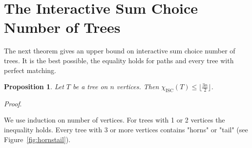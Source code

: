 \documentclass[11pt,a4paper]{article}
\theoremstyle{plain}
\newtheorem{prop}[thm]{Proposition}
\newenvironment{pf}{
  \par\medskip\noindent
  \textit{Proof}.
}{
\newline
\rightline{$\square$}  %
}
\theoremstyle{definition}
\theoremstyle{remark}
\newcommand{\iscn}{\chi_\text{ISC}}
\begin{document}
\section{The Interactive Sum Choice Number of Trees}

The next theorem gives an upper bound on interactive sum choice number of trees. It is the best possible, the equality holds for paths and every tree with perfect matching.

\begin{prop} Let $T$ be a tree on $n$ vertices. Then
$\iscn(T) \leq \lfloor {\frac{3n}{2}} \rfloor$.
\end{prop}








\begin{pf}
We use induction on number of vertices. For trees with 1 or 2 vertices the inequality holds. Every tree with 3 or more vertices contains "horns" or "tail" (see Figure~\ref{fig:hornstail}). 

\begin{figure}[h]
\centering
\begin{subfigure}{.5\textwidth}
  \centering
{}  
  
\end{subfigure}%
\begin{subfigure}{.5\textwidth}
  \centering
  
\end{subfigure}


\end{figure}
\end{pf}
\end{document}
